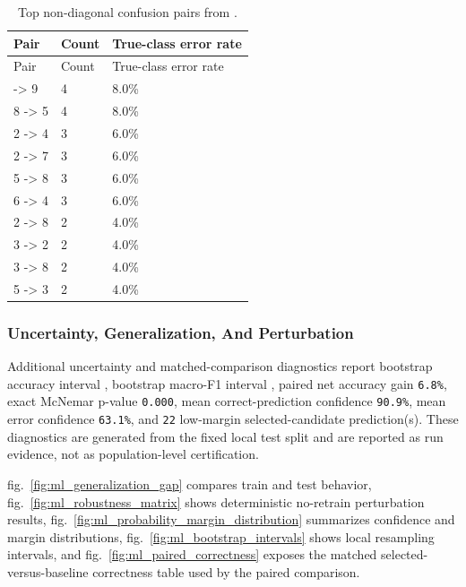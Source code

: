 \documentclass[
]{article}
\begin{document}
\begin{longtable}[]{@{}lll@{}}
\caption{Top non-diagonal confusion pairs from
\protect{}.}\label{tbl:confusion-pairs}\tabularnewline
\toprule\noalign{}
Pair & Count & True-class error rate \\
\midrule\noalign{}
\endfirsthead
\toprule\noalign{}
Pair & Count & True-class error rate \\
\midrule\noalign{}
\endhead
\bottomrule\noalign{}
\endlastfoot
4 -\textgreater{} 9 & 4 & 8.0\% \\
8 -\textgreater{} 5 & 4 & 8.0\% \\
2 -\textgreater{} 4 & 3 & 6.0\% \\
2 -\textgreater{} 7 & 3 & 6.0\% \\
5 -\textgreater{} 8 & 3 & 6.0\% \\
6 -\textgreater{} 4 & 3 & 6.0\% \\
2 -\textgreater{} 8 & 2 & 4.0\% \\
3 -\textgreater{} 2 & 2 & 4.0\% \\
3 -\textgreater{} 8 & 2 & 4.0\% \\
5 -\textgreater{} 3 & 2 & 4.0\% \\
\end{longtable}

\subsubsection{Uncertainty, Generalization, And
Perturbation}\label{sec:uncertainty-generalization-perturbation}

Additional uncertainty and matched-comparison diagnostics report
bootstrap accuracy interval , bootstrap
macro-F1 interval , paired net accuracy gain
\texttt{6.8\%}, exact McNemar p-value \texttt{0.000}, mean
correct-prediction confidence \texttt{90.9\%}, mean error confidence
\texttt{63.1\%}, and \texttt{22} low-margin selected-candidate
prediction(s). These diagnostics are generated from the fixed local test
split and are reported as run evidence, not as population-level
certification.

fig.~\ref{fig:ml_generalization_gap} compares train and test behavior,
fig.~\ref{fig:ml_robustness_matrix} shows deterministic no-retrain
perturbation results, fig.~\ref{fig:ml_probability_margin_distribution}
summarizes confidence and margin distributions,
fig.~\ref{fig:ml_bootstrap_intervals} shows local resampling intervals,
and fig.~\ref{fig:ml_paired_correctness} exposes the matched
selected-versus-baseline correctness table used by the paired
comparison.
\end{document}
